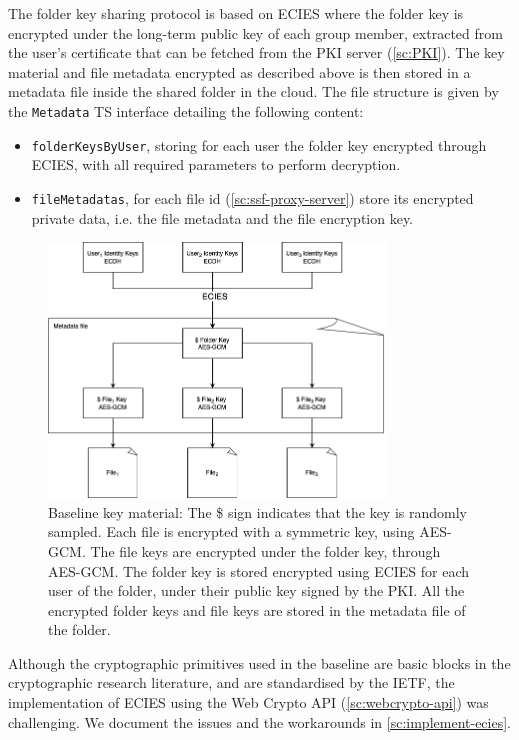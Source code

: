 The folder key sharing protocol is based on ECIES where the folder key
is encrypted under the long-term public key of each group member,
extracted from the user's certificate that can be fetched
from the PKI server (\cref{sc:PKI}).
The key material and file metadata encrypted as described above is
then stored in a metadata file inside the shared folder in the cloud.
The file structure is given by the \texttt{Metadata} TS interface
detailing the following content:
\begin{itemize}
    \item \texttt{folderKeysByUser}, storing for each user the folder key encrypted through ECIES, with all required parameters to perform decryption.
    \item \texttt{fileMetadatas}, for each file id (\cref{sc:ssf-proxy-server}) store its encrypted private data, i.e. the file metadata and the file encryption key.
\end{itemize}

\begin{figure}
    \centering
    \includegraphics[width=0.8\textwidth]{figures/baseline-keys.png}
    \caption{Baseline key material: The \$ sign indicates that the key is randomly sampled. Each file is encrypted with a symmetric key, using AES-GCM. The file keys are encrypted under the folder key, through AES-GCM. The folder key is stored encrypted using ECIES for each user of the folder, under their public key signed by the PKI. 
    All the encrypted folder keys and file keys are stored in the metadata file of the folder.}
    \label{fig:baseline-protocol-hierarchy}
\end{figure}

Although the cryptographic primitives used in the baseline are
basic blocks in the cryptographic research literature,
and are standardised by the IETF, the implementation of
ECIES using the Web Crypto API (\cref{sc:webcrypto-api}) was challenging.
We document the issues and the workarounds in \cref{sc:implement-ecies}.

